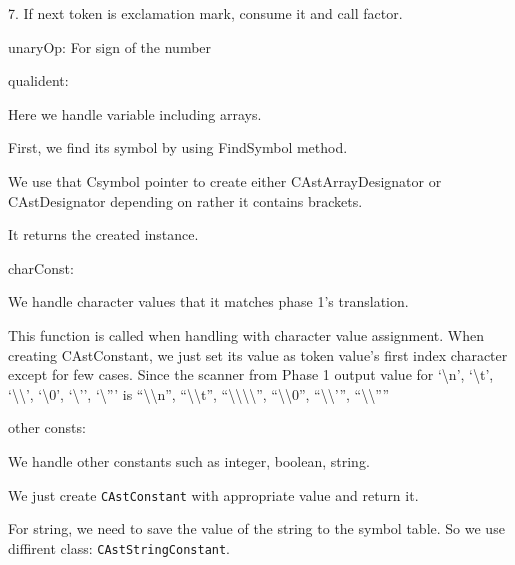 \documentclass[12pt]{article}
\begin{document}
\begin{MyIndentedList}
\begin{MyIndentedList}
        \item 7. If next token is exclamation mark, consume it and call factor.
    \end{MyIndentedList}
    \item unaryOp: For sign of the number
    \item qualident:
        \begin{MyIndentedList}
            \item Here we handle variable including arrays.
            \item First, we find its symbol by using FindSymbol method.
            \item We use that Csymbol pointer to create either CAstArrayDesignator or CAstDesignator depending on rather it contains brackets.
            \item It returns the created instance. 
        \end{MyIndentedList}
    \item charConst:
    \begin{MyIndentedList}
        \item We handle character values that it matches phase 1’s translation. 
        \item This function is called when handling with character value assignment. When creating CAstConstant, we just set its value as token value’s first index character except for few cases. 
        Since the scanner from Phase 1 output value for ‘\textbackslash n’, ‘\textbackslash t’, ‘\textbackslash\textbackslash’, ‘\textbackslash 0’, ‘\textbackslash ’’, ‘\textbackslash ”’ is
        “\textbackslash\textbackslash n”, “\textbackslash\textbackslash t”, “\textbackslash\textbackslash\textbackslash\textbackslash”, “\textbackslash\textbackslash 0”, “\textbackslash\textbackslash ’”, “\textbackslash\textbackslash ””
    \end{MyIndentedList}
    \item other consts:
    \begin{MyIndentedList}
        \item We handle other constants such as integer, boolean, string.
        \item We just create \texttt{CAstConstant} with appropriate value and return it.
        \item For string, we need to save the value of the string to the symbol table. So we use diffirent class: \texttt{CAstStringConstant}.
    \end{MyIndentedList}
\end{MyIndentedList}
\end{document}
